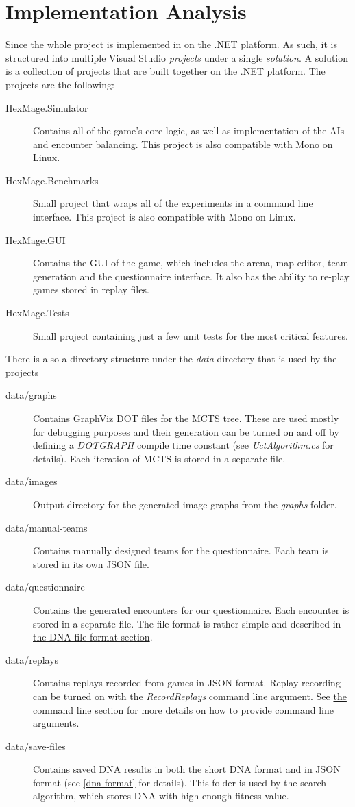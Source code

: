\chapter{Implementation Analysis}
\label{implementation-overview}

Since the whole project is implemented in \Csh{} on the .NET platform. As such, it is structured
into multiple Visual Studio \emph{projects} under a single \emph{solution}. A solution is a collection
of projects that are built together on the .NET platform. The projects are the following:

\begin{description}
	\item[HexMage.Simulator] Contains all of the game's core logic, as well as implementation of the AIs
	and encounter balancing. This project is also compatible with Mono on Linux.
	\item[HexMage.Benchmarks] Small project that wraps all of the experiments in a command line interface.
	This project is also compatible with Mono on Linux.
	\item[HexMage.GUI] Contains the GUI of the game, which includes the arena, map editor, team generation
	and the questionnaire interface. It also has the ability to re-play games stored in replay files.
	\item[HexMage.Tests] Small project containing just a few unit tests for the most critical features.
\end{description}

There is also a directory structure under the \emph{data} directory that is used by the projects

\begin{description}
	\item[data/graphs] Contains GraphViz DOT \citep{graphviz} files for the MCTS tree. These are used mostly for debugging purposes and their generation can be turned on and off by defining a \emph{DOTGRAPH} compile time constant (see \emph{UctAlgorithm.cs} for details). Each iteration of MCTS is stored in a separate file.
	\item[data/images] Output directory for the generated image graphs from the \emph{graphs} folder.
	\item[data/manual-teams] Contains manually designed teams for the questionnaire. Each team is stored in its own JSON \citep{json} file.
	\item[data/questionnaire] Contains the generated encounters for our questionnaire. Each encounter is stored
	in a separate file. The file format is rather simple and described in \hyperref[dna-format]{the DNA file format section}.
	\item[data/replays] Contains replays recorded from games in JSON format. Replay recording can be turned on with the \emph{RecordReplays} command line argument. See \hyperref[cmd-args]{the command line section} for more details on how to provide command line arguments.
	\item[data/save-files] Contains saved DNA results in both the short DNA format and in JSON format (see \autoref{dna-format} for details). This folder is used by the search algorithm, which stores DNA with high enough fitness value.
\end{description}


